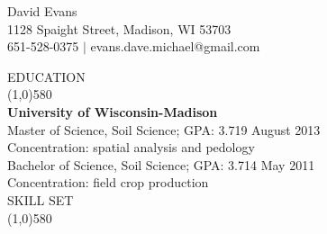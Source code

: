 \documentclass{article}
\begin{document}
\begin{centering}   
\Huge{David Evans} \\
\large{  1128 Spaight Street, Madison, WI 53703 \\
651-528-0375 $|$ evans.dave.michael@gmail.com} \\ 
\bigskip


\onehalfspacing
\end{centering}
\noindent \large{EDUCATION}\\
\line(1,0){580}\\ \normalsize
\textbf{University of Wisconsin-Madison}\\
Master of Science, Soil Science; GPA: 3.719 \hfill August 2013\\
\indent Concentration: spatial analysis and pedology\\
\noindent Bachelor of Science, Soil Science; GPA: 3.714 \hfill May 2011\\
\indent Concentration: field crop production\\

\noindent \large{SKILL SET}\\ 
\line(1,0){580}
\end{document}
